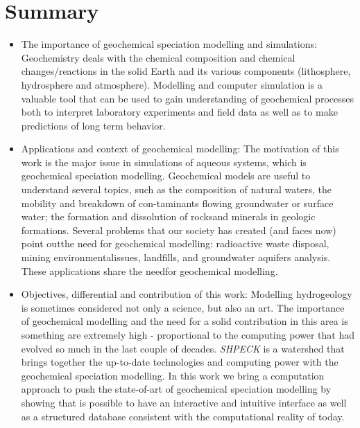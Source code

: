 \documentclass[ppgc,mestrado,english]{iiufrgs}
\begin{document}
\section{Summary}
\begin{itemize}
\item The importance of geochemical speciation modelling and simulations: Geochemistry deals with the chemical composition and chemical changes/reactions in the solid Earth and its various components (lithosphere, hydrosphere and atmosphere). Modelling and computer simulation is a valuable tool that can be used to gain understanding of geochemical processes both to interpret laboratory experiments and field data as well as to make predictions of long term behavior. 
\item Applications and context of geochemical modelling: The motivation of this work is the major issue in simulations of aqueous systems, which is geochemical speciation modelling. Geochemical models are useful to understand several topics, such as the composition of natural waters, the mobility and breakdown of con-taminants flowing groundwater or surface water; the formation and dissolution of rocksand minerals in geologic formations. Several problems that our society has created (and faces now) point outthe need for geochemical modelling: radioactive waste disposal, mining environmentalissues, landfills, and groundwater aquifers analysis. These applications share the needfor geochemical modelling.
\item Objectives, differential and contribution of this work: Modelling hydrogeology is sometimes considered not only a science, but also an art. The importance of geochemical modelling and the need for a solid contribution in this area is something are extremely high - proportional to the computing power that had evolved so much in the last couple of decades. \emph{SHPECK} is a watershed that brings together the up-to-date technologies and computing power with the geochemical speciation modelling. In this work we bring a computation approach to push the state-of-art of geochemical speciation modelling by showing that is possible to have an interactive and intuitive interface as well as a structured database consistent with the computational reality of today.
\end{itemize}

\end{document}
